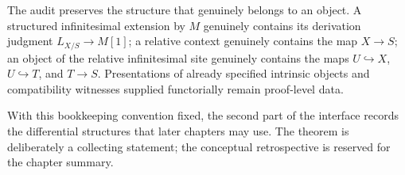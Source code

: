 \begin{remark}
\label{rem:differentiated-genuine-structured-inputs}
The audit preserves the structure that genuinely belongs to an object. A
structured infinitesimal extension by \(M\) genuinely contains its derivation
judgment \(L_{X/S}\to M[1]\); a relative context genuinely contains the map
\(X\to S\); an object of the relative infinitesimal site genuinely contains
the maps \(U\hookrightarrow X\), \(U\hookrightarrow T\), and \(T\to S\).
Presentations of already specified intrinsic objects and compatibility
witnesses supplied functorially remain proof-level data.
\end{remark}
With this bookkeeping convention fixed, the second part of the interface
records the differential structures that later chapters may use. The theorem
is deliberately a collecting statement; the conceptual retrospective is
reserved for the chapter summary.

